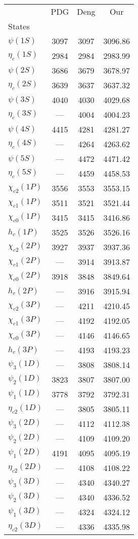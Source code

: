 \begin{tabular}{lccc}
\toprule
{} &   PDG &  Deng &      Our \\
States          &       &       &          \\
\midrule
$\psi(1S)$      &  3097 &  3097 &  3096.86 \\
$\eta_{c}(1S)$  &  2984 &  2984 &  2983.99 \\
$\psi(2S)$      &  3686 &  3679 &  3678.97 \\
$\eta_{c}(2S)$  &  3639 &  3637 &  3637.32 \\
$\psi(3S)$      &  4040 &  4030 &  4029.68 \\
$\eta_{c}(3S)$  &     — &  4004 &  4004.23 \\
$\psi(4S)$      &  4415 &  4281 &  4281.27 \\
$\eta_{c}(4S)$  &     — &  4264 &  4263.62 \\
$\psi(5S)$      &     — &  4472 &  4471.42 \\
$\eta_{c}(5S)$  &     — &  4459 &  4458.53 \\
$\chi_{c2}(1P)$ &  3556 &  3553 &  3553.15 \\
$\chi_{c1}(1P)$ &  3511 &  3521 &  3521.44 \\
$\chi_{c0}(1P)$ &  3415 &  3415 &  3416.86 \\
$h_{c}(1P)$     &  3525 &  3526 &  3526.16 \\
$\chi_{c2}(2P)$ &  3927 &  3937 &  3937.36 \\
$\chi_{c1}(2P)$ &     — &  3914 &  3913.87 \\
$\chi_{c0}(2P)$ &  3918 &  3848 &  3849.64 \\
$h_{c}(2P)$     &     — &  3916 &  3915.94 \\
$\chi_{c2}(3P)$ &     — &  4211 &  4210.45 \\
$\chi_{c1}(3P)$ &     — &  4192 &  4192.05 \\
$\chi_{c0}(3P)$ &     — &  4146 &  4146.65 \\
$h_{c}(3P)$     &     — &  4193 &  4193.23 \\
$\psi_{3}(1D)$  &     — &  3808 &  3808.14 \\
$\psi_{2}(1D)$  &  3823 &  3807 &  3807.00 \\
$\psi_{1}(1D)$  &  3778 &  3792 &  3792.31 \\
$\eta_{c2}(1D)$ &     — &  3805 &  3805.11 \\
$\psi_{3}(2D)$  &     — &  4112 &  4112.38 \\
$\psi_{2}(2D)$  &     — &  4109 &  4109.20 \\
$\psi_{1}(2D)$  &  4191 &  4095 &  4095.19 \\
$\eta_{c2}(2D)$ &     — &  4108 &  4108.22 \\
$\psi_{3}(3D)$  &     — &  4340 &  4340.27 \\
$\psi_{2}(3D)$  &     — &  4340 &  4336.52 \\
$\psi_{1}(3D)$  &     — &  4324 &  4324.12 \\
$\eta_{c2}(3D)$ &     — &  4336 &  4335.98 \\
\bottomrule
\end{tabular}
